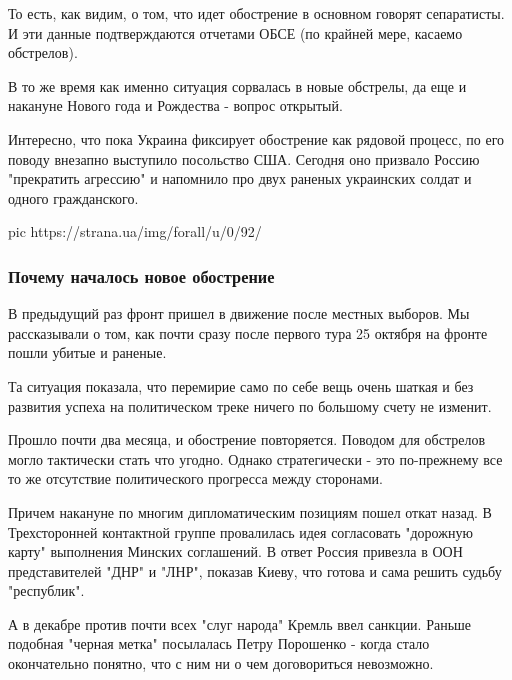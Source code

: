 То есть, как видим, о том, что идет обострение в основном говорят сепаратисты.
И эти данные подтверждаются отчетами ОБСЕ (по крайней мере, касаемо обстрелов). 

В то же время как именно ситуация сорвалась в новые обстрелы, да еще и накануне
Нового года и Рождества - вопрос открытый. 

Интересно, что пока Украина фиксирует обострение как рядовой процесс, по его
поводу внезапно выступило посольство США. Сегодня оно призвало Россию
"прекратить агрессию" и напомнило про двух раненых украинских солдат и одного
гражданского. 

\ifcmt
pic https://strana.ua/img/forall/u/0/92/%
\fi

\subsubsection{Почему началось новое обострение}

В предыдущий раз фронт пришел в движение после местных выборов. Мы рассказывали
о том, как почти сразу после первого тура 25 октября на фронте пошли убитые и
раненые.

Та ситуация показала, что перемирие само по себе вещь очень шаткая и без
развития успеха на политическом треке ничего по большому счету не изменит. 

Прошло почти два месяца, и обострение повторяется. Поводом для обстрелов могло
тактически стать что угодно. Однако стратегически - это по-прежнему все то же
отсутствие политического прогресса между сторонами.

Причем накануне по многим дипломатическим позициям пошел откат назад. В
Трехсторонней контактной группе провалилась идея согласовать "дорожную карту"
выполнения Минских соглашений. В ответ Россия привезла в ООН представителей
"ДНР" и "ЛНР", показав Киеву, что готова и сама решить судьбу "республик".

А в декабре против почти всех "слуг народа" Кремль ввел санкции. Раньше
подобная "черная метка" посылалась Петру Порошенко - когда стало окончательно
понятно, что с ним ни о чем договориться невозможно. 

